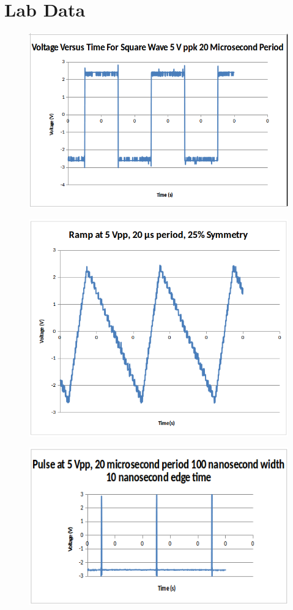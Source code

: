 \documentclass[10pt]{article}
\begin{document}
\section*{Lab Data}
\begin{figure}[H]
	\centering
	\includegraphics[width=\textwidth]{Square}
\end{figure}
\begin{figure}[H]
	\centering
	\includegraphics[width=\textwidth]{Ramp25}
\end{figure}
\begin{figure}[H]
	\centering
	\includegraphics[width=\textwidth]{Pulse10}
\end{figure}
\end{document}
